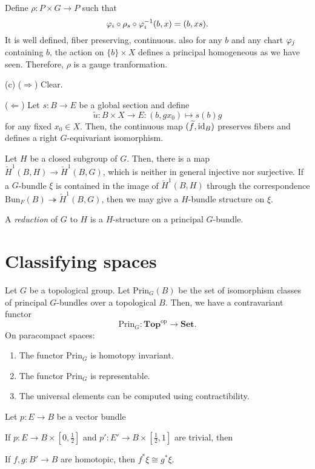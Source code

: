 \documentclass{../../large}
\begin{document}
\begin{pf}
Define $\rho:P\times G\to P$ such that
\[\varphi_i\circ\rho_s\circ\varphi_i^{-1}(b,x)=(b,xs).\]
It is well defined, fiber preserving, continuous.
also for any $b$ and any chart $\varphi_j$ containing $b$, the action on $\{b\}\times X$ defines a principal homogeneous as we have seen.
Therefore, $\rho$ is a gauge tranformation.

(c)
($\Rightarrow$)
Clear.

($\Leftarrow$)
Let $s:B\to E$ be a global section and define
\[\tilde u:B\times X\to E:(b,gx_0)\mapsto s(b)g\]
for any fixed $x_0\in X$.
Then, the continuous map $(\widetilde f,\operatorname{id}_B)$ preserves fibers and defines a right $G$-equivariant isomorphism.
\end{pf}

\begin{prb}

\end{prb}

\begin{prb}
Let $H$ be a closed subgroup of $G$.
Then, there is a map $\check H^1(B,H)\to\check H^1(B,G)$, which is neither in general injective nor surjective.
If a $G$-bundle $\xi$ is contained in the image of $\check H^1(B,H)$ through the correspondence $\mathrm{Bun}_F(B)\twoheadrightarrow\check H^1(B,G)$, then we may give a $H$-bundle structure on $\xi$.

A \emph{reduction} of $G$ to $H$ is a $H$-structure on a principal $G$-bundle.
\end{prb}

\section{Classifying spaces}

Let $G$ be a topological group.
Let $\mathrm{Prin}_G(B)$ be the set of isomorphism classes of principal $G$-bundles over a topological $B$.
Then, we have a contravariant functor
\[\mathrm{Prin}_G:\mathbf{Top}^{\mathrm{op}}\to\mathbf{Set}.\]
On paracompact spaces:
\begin{enumerate}
\item The functor $\mathrm{Prin}_G$ is homotopy invariant.
\item The functor $\mathrm{Prin}_G$ is representable.
\item The universal elements can be computed using contractibility.
\end{enumerate}

\begin{prb}
Let $p:E\to B$ be a vector bundle
\begin{parts}
\item If $p:E\to B\times[0,\frac12]$ and $p':E'\to B\times[\frac12,1]$ are trivial, then 
\item If $f,g:B'\to B$ are homotopic, then $f^*\xi\cong g^*\xi$.
\end{parts}
\end{prb}
\end{document}
